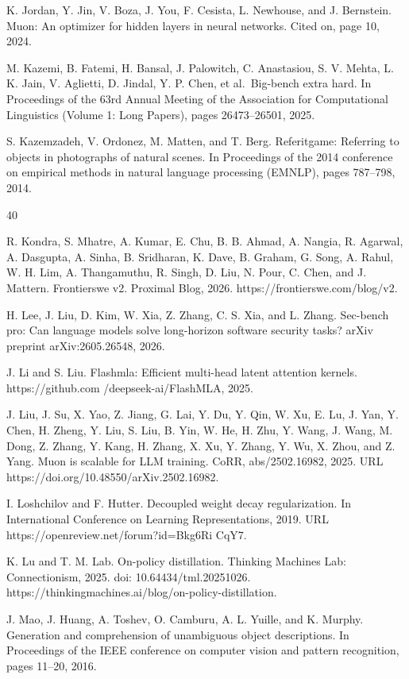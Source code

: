 \documentclass[
  10
]{article}
\begin{document}
K. Jordan, Y. Jin, V. Boza, J. You, F. Cesista, L. Newhouse, and J.
Bernstein. Muon: An optimizer for hidden layers in neural networks.
Cited on, page 10, 2024.

M. Kazemi, B. Fatemi, H. Bansal, J. Palowitch, C. Anastasiou, S. V.
Mehta, L. K. Jain, V. Aglietti, D. Jindal, Y. P. Chen, et al.~Big-bench
extra hard. In Proceedings of the 63rd Annual Meeting of the Association
for Computational Linguistics (Volume 1: Long Papers), pages
26473--26501, 2025.

S. Kazemzadeh, V. Ordonez, M. Matten, and T. Berg. Referitgame:
Referring to objects in photographs of natural scenes. In Proceedings of
the 2014 conference on empirical methods in natural language processing
(EMNLP), pages 787--798, 2014.

40

R. Kondra, S. Mhatre, A. Kumar, E. Chu, B. B. Ahmad, A. Nangia, R.
Agarwal, A. Dasgupta, A. Sinha, B. Sridharan, K. Dave, B. Graham, G.
Song, A. Rahul, W. H. Lim, A. Thangamuthu, R. Singh, D. Liu, N. Pour, C.
Chen, and J. Mattern. Frontierswe v2. Proximal Blog, 2026.
https://frontierswe.com/blog/v2.

H. Lee, J. Liu, D. Kim, W. Xia, Z. Zhang, C. S. Xia, and L. Zhang.
Sec-bench pro: Can language models solve long-horizon software security
tasks? arXiv preprint arXiv:2605.26548, 2026.

J. Li and S. Liu. Flashmla: Efficient multi-head latent attention
kernels. https://github.com /deepseek-ai/FlashMLA, 2025.

J. Liu, J. Su, X. Yao, Z. Jiang, G. Lai, Y. Du, Y. Qin, W. Xu, E. Lu, J.
Yan, Y. Chen, H. Zheng, Y. Liu, S. Liu, B. Yin, W. He, H. Zhu, Y. Wang,
J. Wang, M. Dong, Z. Zhang, Y. Kang, H. Zhang, X. Xu, Y. Zhang, Y. Wu,
X. Zhou, and Z. Yang. Muon is scalable for LLM training. CoRR,
abs/2502.16982, 2025. URL https://doi.org/10.48550/arXiv.2502.16982.

I. Loshchilov and F. Hutter. Decoupled weight decay regularization. In
International Conference on Learning Representations, 2019. URL
https://openreview.net/forum?id=Bkg6Ri CqY7.

K. Lu and T. M. Lab. On-policy distillation. Thinking Machines Lab:
Connectionism, 2025. doi: 10.64434/tml.20251026.
https://thinkingmachines.ai/blog/on-policy-distillation.

J. Mao, J. Huang, A. Toshev, O. Camburu, A. L. Yuille, and K. Murphy.
Generation and comprehension of unambiguous object descriptions. In
Proceedings of the IEEE conference on computer vision and pattern
recognition, pages 11--20, 2016.
\end{document}
